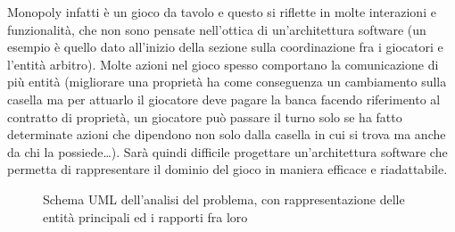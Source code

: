 Monopoly infatti è un gioco da tavolo e questo si riflette in molte interazioni e funzionalità, che non sono pensate 
nell'ottica di un'architettura software (un esempio è quello dato all'inizio della sezione sulla coordinazione fra i giocatori e 
l'entità arbitro). Molte azioni nel gioco spesso comportano la comunicazione di più entità (migliorare una
proprietà ha come conseguenza un cambiamento sulla casella ma per attuarlo il giocatore deve pagare la banca facendo riferimento
al contratto di proprietà, un giocatore può passare il turno solo se ha fatto determinate azioni che dipendono non solo dalla casella in cui
si trova ma anche da chi la possiede\dots). 
Sarà quindi difficile progettare un'architettura software che permetta di rappresentare il dominio del gioco
in maniera efficace e riadattabile. 


\begin{figure}[H]
    \centering
    \caption{Schema UML dell'analisi del problema, con rappresentazione delle entità principali ed i rapporti fra loro}
	\label{img:entity_diagram}
\end{figure}
